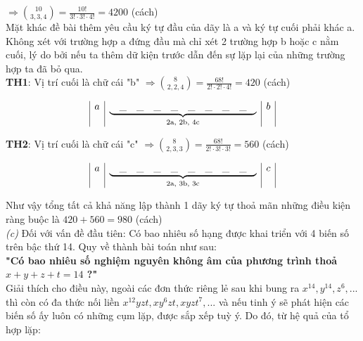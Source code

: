 \documentclass[a4paper]{exam}
\begin{document}
	$\Longrightarrow \binom{10}{3,3,4} = \frac{10!}{3! \cdot 3! \cdot 4!} = 4200$ (cách)\\
	
	Mặt khác đề bài thêm yêu cầu ký tự đầu của dãy là a và ký tự cuối phải khác a. Không xét với trường hợp a đứng đầu mà chỉ xét 2 trường hợp b hoặc c nằm cuối, lý do bởi nếu ta thêm dữ kiện trước dẫn đến sự lặp lại của những trường hợp ta đã bỏ qua.\\
	
	\textbf{TH1}: Vị trí cuối là chữ cái "b" $\Longrightarrow \binom{8}{2,2,4} = \frac{68!}{2! \cdot 2! \cdot 4!} = 420$ (cách)
	
	\begin{center}
		\[
		\begin{array}{|c|c|c|c|c|c|c|c|c|c|c|}
			a & \multicolumn{8}{c|}{\underbrace{\quad \_ \quad \_ \quad \_ \quad \_ \quad \_ \quad \_ \quad \_ \quad \_ \quad}_{\text{2a, 2b, 4c}}} & b
		\end{array}
		\]
	\end{center}
	
	\textbf{TH2}: Vị trí cuối là chữ cái "c" $\Longrightarrow \binom{8}{2,3,3} = \frac{68!}{2! \cdot 3! \cdot 3!} = 560$ (cách)
	
	\begin{center}
		\[
		\begin{array}{|c|c|c|c|c|c|c|c|c|c|c|}
			a & \multicolumn{8}{c|}{\underbrace{\quad \_ \quad \_ \quad \_ \quad \_ \quad \_ \quad \_ \quad \_ \quad \_ \quad}_{\text{2a, 3b, 3c}}} & c
		\end{array}
		\]
	\end{center}

	Như vậy tổng tất cả khả năng lập thành 1 dãy ký tự thoả mãn những điều kiện ràng buộc là $420 + 560 = 980$ (cách)\\
	
	\textit{(c)} Đối với vấn đề đầu tiên: Có bao nhiêu số hạng được khai triển với 4 biến số trên bậc thứ 14. Quy về thành bài toán như sau:\\
	
	\textbf{"Có bao nhiêu số nghiệm nguyên không âm của phương trình thoả $x + y + z + t = 14$ ?"}\\
	
	Giải thích cho điều này, ngoài các đơn thức riêng lẻ sau khi bung ra $x^{14}, y^{14}, z^{6},...$ thì còn có đa thức nối liền $x^{12}yzt, xy^{6}zt, xyzt^{7},...$ và nếu tinh ý sẽ phát hiện các biến số ấy luôn có những cụm lặp, được sắp xếp tuỳ ý. Do đó, từ hệ quả của tổ hợp lặp:\\
	
\end{document}
